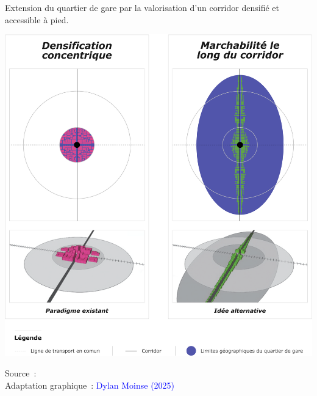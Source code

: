 \begin{refsegment}
    \begin{carte}[h!]\vspace*{4pt}
        \caption{Extension du quartier de gare par la valorisation d'un corridor densifié et accessible à pied.}
        \label{fig-chap1:tod-corridor-pieton}
        \centerline{\includegraphics[width=1\columnwidth]{src/Figures/Chap-1/FR_Corridor_pieton.pdf}}
        \vspace{5pt}
        \begin{flushright}\scriptsize{
        Source~: \textcolor{blue}{\textcite[163]{park_can_2015}}
        \\
        Adaptation graphique~: \textcolor{blue}{Dylan Moinse (2025)}
        }\end{flushright}
    \end{carte}


\end{refsegment}
